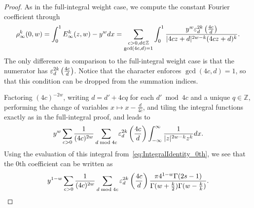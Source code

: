 \begin{proof}
  As in the full-integral weight case, we compute the constant Fourier coefficient through
  \begin{equation}
    \rho_\infty^k(0,w) = \int_0^1 E_\infty^k(z,w) - y^w dx =
    \sum_{\substack{c > 0, d \in \mathbb{Z} \\ \gcd(4c, d) = 1}}
    \int_0^1 \frac{y^w \varepsilon_d^{2k} \left(\frac{4c}{d}\right)}
    {\lvert 4cz + d \rvert^{2w - k} (4cz + d)^k}.
  \end{equation}
  The only difference in comparison to the full-integral weight case is that the numerator
  has $\varepsilon_d^{2k} \left(\frac{4c}{d}\right)$.
  Notice that the character enforces $\gcd(4c, d) = 1$, so that this condition can be
  dropped from the summation indices.

  Factoring $(4c)^{-2w}$, writing $d = d' + 4cq$ for each $d' \bmod 4c$ and a unique
  $q \in \mathbb{Z}$, performing the change of variables $x \mapsto x - \frac{d}{4c}$, and
  tiling the integral functions exactly as in the full-integral proof, and leads to
  \begin{equation}
    y^w \sum_{c > 0} \frac{1}{(4c)^{2w}} \sum_{d \bmod 4c} \varepsilon_d^{2k} \left(\frac{4c}{d}\right)
    \int_{-\infty}^\infty \frac{1}{\lvert z \rvert^{2w-k} z^k} dx.
  \end{equation}
  Using the evaluation of this integral from~\eqref{eq:IntegralIdentity_0th}, we see that
  the $0$th coefficient can be written as
  \begin{equation}
    y^{1-w} \sum_{c > 0} \frac{1}{(4c)^{2w}} \sum_{d \bmod 4c} \varepsilon_d^{2k}
    \left(\frac{4c}{d}\right) \frac{\pi 4^{1-w} \Gamma(2s - 1)}{\Gamma(w + \frac{k}{2})
    \Gamma(w - \frac{k}{k})}.
  \end{equation}


\end{proof}
